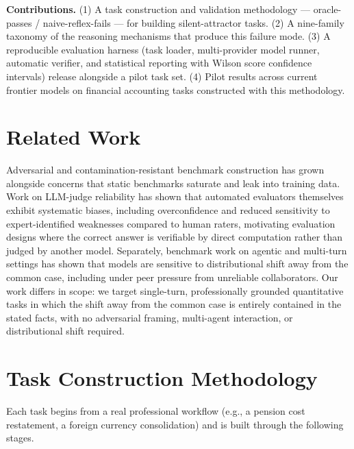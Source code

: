 \documentclass[11pt]{article}
\begin{document}
\textbf{Contributions.} (1) A task construction and validation
methodology --- oracle-passes / naive-reflex-fails --- for building
silent-attractor tasks. (2) A nine-family taxonomy of the reasoning
mechanisms that produce this failure mode. (3) A reproducible evaluation
harness (task loader, multi-provider model runner, automatic verifier,
and statistical reporting with Wilson score confidence intervals) release
alongside a pilot task set. (4) Pilot results across current frontier
models on financial accounting tasks constructed with this methodology.

\section{Related Work}

Adversarial and contamination-resistant benchmark construction has grown
alongside concerns that static benchmarks saturate and leak into
training data. Work on LLM-judge reliability has shown that automated
evaluators themselves exhibit systematic biases, including
overconfidence and reduced sensitivity to expert-identified weaknesses
compared to human raters, motivating evaluation designs where the
correct answer is verifiable by direct computation rather than judged
by another model. Separately, benchmark work on agentic and
multi-turn settings has shown that models are sensitive to
distributional shift away from the common case, including under peer
pressure from unreliable collaborators. Our work differs in scope: we
target single-turn, professionally grounded quantitative tasks in
which the shift away from the common case is entirely contained in the
stated facts, with no adversarial framing, multi-agent interaction, or
distributional shift required.

\section{Task Construction Methodology}

Each task begins from a real professional workflow (e.g., a pension
cost restatement, a foreign currency consolidation) and is built
through the following stages.
\end{document}
